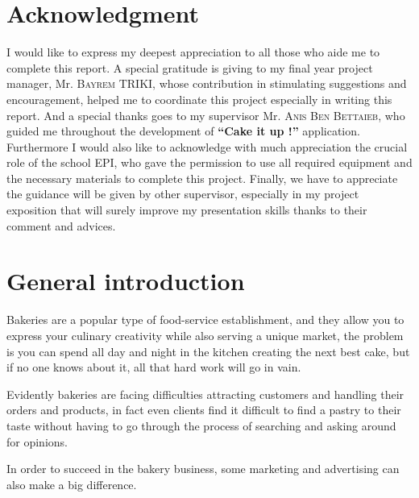 \documentclass[12pt,a4paper]{report}
\begin{document}
	
	
	
	
	\setcounter{page}{1}
	
	\chapter*{\centering Acknowledgment}
	
	I would like to express my deepest appreciation to all those who aide me to complete this report.  A special gratitude is giving to my final year project  manager, Mr. \textsc{Bayrem TRIKI}, whose contribution in stimulating suggestions and encouragement,  helped me to coordinate this project especially in writing this report. And a special thanks goes to my supervisor Mr. \textsc{Anis Ben Bettaieb}, who guided me throughout the development of  \textbf{``Cake it up !''} application.\\
	
	Furthermore I would also like to acknowledge with much appreciation the crucial role of the school EPI, who gave the permission to use all required  equipment and the necessary materials to complete this project. Finally, we have to appreciate the guidance will be given by other supervisor, especially in my project exposition that will surely improve my presentation skills thanks to their comment and advices.
	
	\cleardoublepage
	\tableofcontents
	\cleardoublepage
	\listoffigures	
	\cleardoublepage
	\listoftables	
	\clearpage 
	\printacronyms[include-classes=abbrev,name=List of Abbreviations]
	\cleardoublepage
	\setcounter{page}{1}
	
	
	\chapter*{\centering General introduction}
	Bakeries are a popular type of food-service establishment, and they allow you to express your culinary creativity while also serving a unique market, the problem is you can spend all day and night in the kitchen creating the next best cake, but if no one knows about it, all that hard work will go in vain.  \par 
	Evidently bakeries are facing difficulties attracting customers and handling their orders and products, in fact even clients find it difficult to find a pastry to their taste without having to go through the process of searching and asking around for opinions.\par
	In order to succeed in the bakery business,  some marketing and advertising can also make a big difference.\par
	
\end{document}
